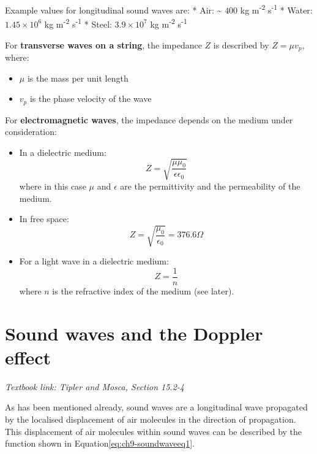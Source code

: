\documentclass[
]{book}
\providecommand{\tightlist}{%
  \setlength{\itemsep}{0pt}\setlength{\parskip}{0pt}}
\begin{document}
Example values for longitudinal sound waves are:
* Air: \textasciitilde{} \(400\) kg m\textsuperscript{-2} s\textsuperscript{-1}
* Water: \(1.45 \times 10^6\) kg m\textsuperscript{-2} s\textsuperscript{-1}
* Steel: \(3.9 \times 10^7\) kg m\textsuperscript{-2} s\textsuperscript{-1}

For \textbf{transverse waves on a string}, the impedance \(Z\) is described by \(Z = \mu v_p\), where:

\begin{itemize}
\tightlist
\item
  \(\mu\) is the mass per unit length
\item
  \(v_p\) is the phase velocity of the wave
\end{itemize}

For \textbf{electromagnetic waves}, the impedance depends on the medium under consideration:

\begin{itemize}
\item
  In a dielectric medium:
  \begin{equation}
  Z = \sqrt{\frac{\mu \mu_0}{\epsilon \epsilon_0}}
  \end{equation}
  where in this case \(\mu\) and \(\epsilon\) are the permittivity and the permeability of the medium.
\item
  In free space:
  \begin{equation}
  Z = \sqrt{\frac{ \mu_0}{ \epsilon_0}} = 376.6 \Omega
  \end{equation}
\item
  For a light wave in a dielectric medium:
  \begin{equation}
  Z = \frac{1}{n}
  \end{equation}
  where \(n\) is the refractive index of the medium (see later).
\end{itemize}

\hypertarget{sec-ch9-sounddoppler}{%
\chapter{Sound waves and the Doppler effect}\label{sec-ch9-sounddoppler}}

\emph{Textbook link: Tipler and Mosca, Section 15.2-4}

As has been mentioned already, sound waves are a longitudinal wave propagated by the localised displacement of air molecules in the direction of propagation. This displacement of air molecules within sound waves can be described by the function shown in Equation\eqref{eq:ch9-soundwaveeq1}.
\end{document}
